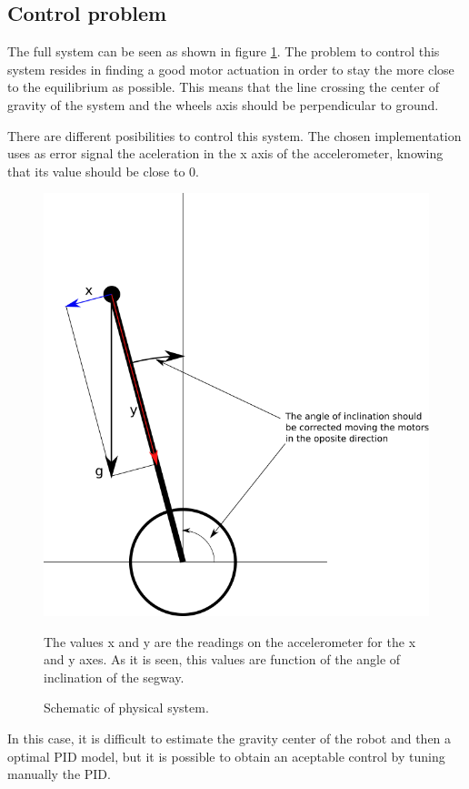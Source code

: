 \subsection{Control problem}

The full system can be seen as shown in figure \ref{fig:controlsch}.
The problem to control this system resides in finding a good motor actuation in order to stay the more close to the equilibrium as possible.
This means that the line crossing the center of gravity of the system and the wheels axis should be perpendicular to ground.

There are different posibilities to control this system.
The chosen implementation uses as error signal the aceleration in the x axis of the accelerometer, knowing that its value should be close to 0.

\begin{figure}[H]
\centering
\includegraphics[width = 0.5 \textwidth]{images/segway_scheme}
\caption{Schematic of physical system.}{ The values x and y are the readings on the accelerometer for the x and y axes. As it is seen, this values are function of the angle of inclination of the segway.}
\label{fig:controlsch}
\end{figure}

In this case, it is difficult to estimate the gravity center of the robot and then a optimal PID model, but it is possible to obtain an aceptable control by tuning manually the PID.

